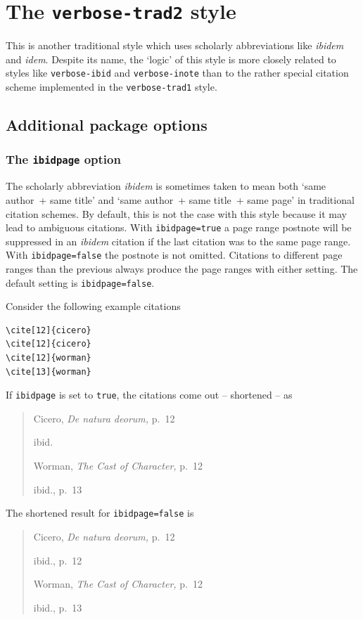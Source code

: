 \documentclass[a4paper]{article}
\begin{document}
\section*{The \texttt{verbose-trad2} style}

This is another traditional style which uses scholarly abbreviations
like \emph{ibidem} and \emph{idem}. Despite its name, the `logic' of
this style is more closely related to styles like
\texttt{verbose-ibid} and \texttt{verbose-inote} than to the rather
special citation scheme implemented in the \texttt{verbose-trad1}
style.

\subsection*{Additional package options}

\subsubsection*{The \texttt{ibidpage} option}

The scholarly abbreviation \emph{ibidem} is sometimes taken to mean
both `same author~+ same title' and `same author~+ same title~+ same
page' in traditional citation schemes. By default, this is not the
case with this style because it may lead to ambiguous citations.
With \texttt{ibidpage=true} a page range postnote will be suppressed
in an \emph{ibidem} citation if the last citation was to the same
page range. With \texttt{ibidpage=false} the postnote is not omitted.
Citations to different page ranges than the previous always produce
the page ranges with either setting.
The default setting is \texttt{ibidpage=false}.

Consider the following example citations
\begin{verbatim}
\cite[12]{cicero}
\cite[12]{cicero}
\cite[12]{worman}
\cite[13]{worman}
\end{verbatim}
%
If \texttt{ibidpage} is set to \texttt{true}, the citations
come out -- shortened -- as
\begin{quote}
Cicero, \emph{De natura deorum,} p.~12

ibid.

Worman, \emph{The Cast of Character,} p.~12

ibid., p.~13
\end{quote}
%
The shortened result for \texttt{ibidpage=false} is
\begin{quote}
Cicero, \emph{De natura deorum,} p.~12

ibid., p.~12

Worman, \emph{The Cast of Character,} p.~12

ibid., p.~13
\end{quote}
\end{document}
